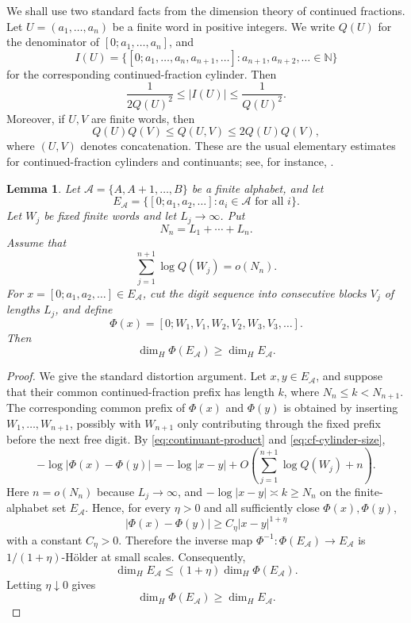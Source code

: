 \documentclass[11pt]{amsart}
\newtheorem{lemma}[theorem]{Lemma}
\newcommand{\N}{\mathbb N}
\begin{document}
We shall use two standard facts from the dimension theory of continued fractions.  Let $U=(a_1,\ldots,a_n)$ be a finite word in positive integers.  We write $Q(U)$ for the denominator of $[0;a_1,\ldots,a_n]$, and
$$
        I(U)=\{[0;a_1,\ldots,a_n,a_{n+1},\ldots]:a_{n+1},a_{n+2},\ldots\in\N\}
$$
for the corresponding continued-fraction cylinder.  Then
\begin{equation}\label{eq:cf-cylinder-size}
        \frac{1}{2Q(U)^2}\le |I(U)|\le \frac{1}{Q(U)^2}.
\end{equation}
Moreover, if $U,V$ are finite words, then
\begin{equation}\label{eq:continuant-product}
        Q(U)Q(V)\le Q(U,V)\le 2Q(U)Q(V),
\end{equation}
where $(U,V)$ denotes concatenation.  These are the usual elementary estimates
for continued-fraction cylinders and continuants; see, for instance,
\cite[Chapter~1]{KhinchinCF}.


\begin{lemma}\label{lem:zero-density-insertion}
Let $\mathcal A=\{A,A+1,\ldots,B\}$ be a finite alphabet, and let
$$
        E_{\mathcal A}=\{[0;a_1,a_2,\ldots]:a_i\in\mathcal A\text{ for all }i\}.
$$
Let $W_j$ be fixed finite words and let $L_j\to\infty$.  Put
$$
        N_n=L_1+\cdots+L_n.
$$
Assume that
$$
        \sum_{j=1}^{n+1}\log Q(W_j)=o(N_n).
$$
For $x=[0;a_1,a_2,\ldots]\in E_{\mathcal A}$, cut the digit sequence into consecutive blocks $V_j$ of lengths $L_j$, and define
$$
        \Phi(x)=[0;W_1,V_1,W_2,V_2,W_3,V_3,\ldots].
$$
Then
$$
        \dim_H \Phi(E_{\mathcal A})\ge \dim_H E_{\mathcal A}.
$$
\end{lemma}

\begin{proof}
We give the standard distortion argument.  Let $x,y\in E_{\mathcal A}$, and suppose that their common continued-fraction prefix has length $k$, where $N_n\le k<N_{n+1}$.  The corresponding common prefix of $\Phi(x)$ and $\Phi(y)$ is obtained by inserting $W_1,\ldots,W_{n+1}$, possibly with $W_{n+1}$ only contributing through the fixed prefix before the next free digit.  By \eqref{eq:continuant-product} and \eqref{eq:cf-cylinder-size},
$$
        -\log |\Phi(x)-\Phi(y)|
        =
        -\log |x-y|+O\left(\sum_{j=1}^{n+1}\log Q(W_j)+n\right).
$$
Here $n=o(N_n)$ because $L_j\to\infty$, and $-\log |x-y|\asymp k\geq N_n$ on the finite-alphabet set $E_{\mathcal A}$.  Hence, for every $\eta>0$ and all sufficiently close $\Phi(x),\Phi(y)$,
$$
        |\Phi(x)-\Phi(y)|\ge C_\eta |x-y|^{1+\eta}
$$
with a constant $C_\eta>0$.  Therefore the inverse map $\Phi^{-1}:\Phi(E_{\mathcal A})\to E_{\mathcal A}$ is $1/(1+\eta)$-H\"older at small scales.  Consequently,
$$
        \dim_H E_{\mathcal A}
        \le
        (1+\eta)\dim_H \Phi(E_{\mathcal A}).
$$
Letting $\eta\downarrow0$ gives
$$
        \dim_H \Phi(E_{\mathcal A})\ge \dim_H E_{\mathcal A}.
$$
\end{proof}
\end{document}
